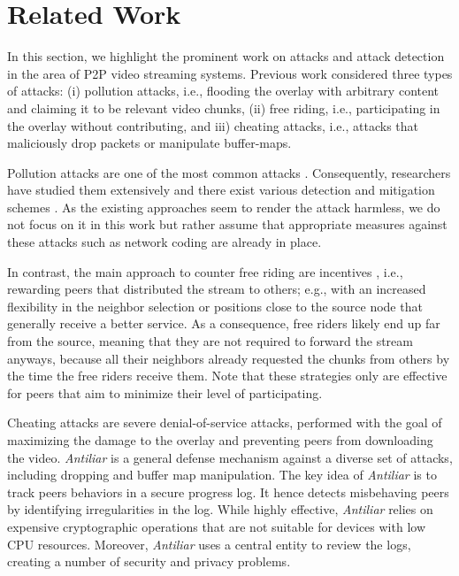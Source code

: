 \section{Related Work}
\label{sec:related}

In this section, we highlight the prominent work on attacks and attack detection in the area of P2P video streaming systems.
Previous work considered three types of attacks: (i) pollution attacks, i.e., flooding the overlay with arbitrary content and claiming it to be relevant video chunks, (ii) free riding, i.e., participating in the overlay without contributing, and iii) cheating attacks, i.e., attacks that maliciously drop packets or manipulate buffer-maps. 

Pollution attacks are one of the most common attacks \cite{pollution1}.
Consequently, researchers have studied them extensively and there exist various detection and mitigation schemes \cite{pollution2}.    
As the existing approaches seem to render the attack harmless, we do not focus on it in this work but rather assume that appropriate measures against these attacks such as network coding \cite{nc} are already in place.

In contrast, the main approach to counter free riding are incentives \cite{defending,defending2}, i.e., rewarding peers that distributed the stream to others; e.g., with an increased flexibility in the neighbor selection or positions close to the source node that generally receive a better service. 
As a consequence, free riders likely end up far from the source, meaning that they are not required to forward the stream anyways, because all their neighbors already requested the chunks from others by the time the free riders receive them. 
Note that these strategies only are effective for peers that aim to minimize their level of participating. 


Cheating attacks are severe denial-of-service attacks, performed with the goal of maximizing the damage to the overlay and preventing peers from downloading the video.   
\textit{Antiliar} is a general defense mechanism against a diverse set of attacks, including dropping and buffer map manipulation\cite{antiliar}.
The key idea of \textit{Antiliar} is to track peers behaviors in a secure progress log. It hence detects misbehaving peers by identifying irregularities in the log. While highly effective, \textit{Antiliar} relies on expensive cryptographic operations that are not suitable for  devices with low CPU resources.
Moreover, \textit{Antiliar} uses a central entity to review the logs, creating a number of security and privacy problems. 

